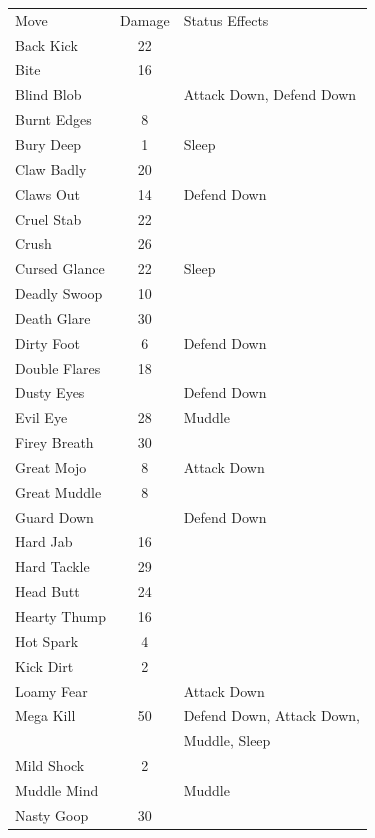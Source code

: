 \documentclass[10pt,twocolumn]{memoir}
\begin{document}
\begin{tabular}{l c l}
             Move & Damage & Status Effects \\
             Back Kick & 22 & \\
             Bite & 16 & \\
             Blind Blob & & Attack Down, Defend Down \\
             Burnt Edges & 8 & \\
             Bury Deep & 1 & Sleep \\
             Claw Badly & 20 & \\
             Claws Out & 14 & Defend Down \\
             Cruel Stab & 22 & \\
             Crush & 26 & \\
             Cursed Glance & 22 & Sleep \\
             Deadly Swoop & 10 & \\
             Death Glare & 30 & \\
             Dirty Foot & 6 & Defend Down \\
             Double Flares & 18 & \\
             Dusty Eyes & & Defend Down \\
             Evil Eye & 28 & Muddle \\
             Firey Breath & 30 & \\
             Great Mojo & 8 & Attack Down \\
             Great Muddle & 8 & \\
             Guard Down & & Defend Down \\
             Hard Jab & 16 & \\
             Hard Tackle & 29 & \\
             Head Butt & 24 & \\
             Hearty Thump & 16 & \\
             Hot Spark & 4 & \\
             Kick Dirt & 2 & \\
             Loamy Fear & & Attack Down \\
             Mega Kill & 50 & Defend Down, Attack Down, \\ & & Muddle, Sleep \\
             Mild Shock & 2 & \\
             Muddle Mind & & Muddle \\
             Nasty Goop & 30 & \\

\end{tabular}
\end{document}
